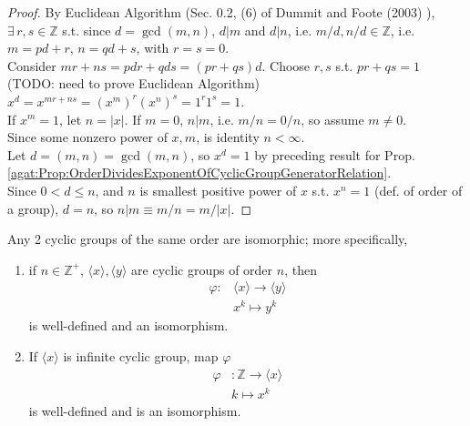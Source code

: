 \begin{proof}
	By Euclidean Algorithm (Sec. 0.2, (6) of Dummit and Foote (2003) \cite{agat:DuFo2003}), $\exists \, r, s \in \mathbb{Z}$ s.t. since $d= \gcd{(m,n)}$, $d|m$ and $d|n$, i.e. $m/d, n/d \in \mathbb{Z}$, i.e. $m = pd + r$, $n=qd + s$, with $r=s=0$. \\
	
	Consider $mr+ns = pdr + qds = (pr+qs)d$. Choose $r,s$ s.t. $pr + qs = 1$ (TODO: need to prove Euclidean Algorithm) \\

	$x^d = x^{mr + ns} = (x^m)^r (x^n)^s = 1^r 1^s = 1$. \\
	
	If $x^m = 1$, let $n=|x|$. If $m=0$, $n |m$, i.e. $m/n = 0/n$, so assume $m \neq 0$. \\
	
	Since some nonzero power of $x,m$, is identity $n < \infty$. \\
	
	Let $d= (m,n) = \gcd{(m,n)}$, so $x^d = 1$ by preceding result for Prop. \ref{agat:Prop:OrderDividesExponentOfCyclicGroupGeneratorRelation}. \\
	
	Since $0 < d \leq n$, and $n$ is smallest positive power of $x$ s.t. $x^n= 1$ (def. of order of a group), $d=n$, so $n | m \equiv m/n = m / |x|$. 
\end{proof} 

\begin{theorem}\label{agat:Thm:CyclicGroupSameOrderIsomorphism}
	Any 2 cyclic groups of the same order are isomorphic; more specifically, 
	\begin{enumerate}
		\item[(1)] if $n\in \mathbb{Z}^+$, $\langle x \rangle, \langle y \rangle$ are cyclic groups of order $n$, then
		\begin{equation}
			\begin{aligned}
				\varphi : & \langle x \rangle \to \langle y \rangle \\
				& x^k \mapsto y^k 
			\end{aligned}
		\end{equation}
		is well-defined and an isomorphism.
		\item[(2)] If $\langle x \rangle$ is infinite cyclic group, map $\varphi$ 
		\begin{equation}
			\begin{aligned}
				\varphi & : \mathbb{Z} \to \langle x \rangle \\
				& k \mapsto x^k
			\end{aligned}
		\end{equation}
		is well-defined and is an isomorphism.
	\end{enumerate}
\end{theorem} 

